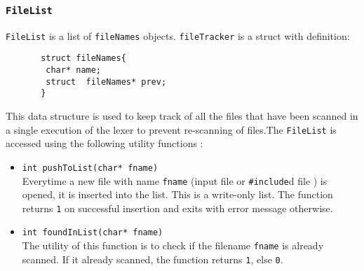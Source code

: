 \documentclass[12pt]{article}
\begin{document}
\subsubsection{\texttt{FileList}}
\label{FL}

\texttt{FileList} is a list of \texttt{fileNames} objects. \texttt{fileTracker} is a struct with definition:
\begin{verbatim}
       struct fileNames{
        char* name;
        struct  fileNames* prev;
       }
\end{verbatim}
This data structure is used to keep track of all the files that have been scanned in a single execution of the lexer to prevent re-scanning of files.The \texttt{FileList} is accessed using the following utility functions :

\begin{itemize}
\item \texttt{int pushToList(char* fname)}
\\Everytime a new file with name \texttt{fname} (input file or \texttt{\#include}d file ) is opened, it is inserted into the list. This is a write-only list. The function returns \texttt{1} on successful insertion and exits with error message otherwise. 

\item \texttt{int foundInList(char* fname)}
\\ The utility of this function is to check if the filename \texttt{fname} is already scanned. If it already scanned, the function returns \texttt{1}, else \texttt{0}.

\end{itemize}
\end{document}
